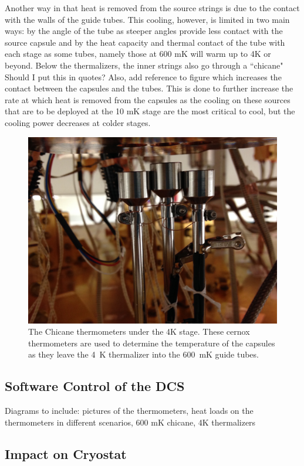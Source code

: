 Another way in that heat is removed from the source strings is due to the contact with the walls of the guide tubes. This cooling, however, is limited in two main ways: by the angle of the tube as steeper angles provide less contact with the source capsule and by the heat capacity and thermal contact of the tube with each stage as some tubes, namely those at 600 mK will warm up to 4K or beyond. Below the thermalizers, the inner strings also go through a ``chicane" \color{red} Should I put this in quotes? Also, add reference to figure\color{black} which increases the contact between the capsules and the tubes. This is done to further increase the rate at which heat is removed from the capsules as the cooling on these sources that are to be deployed at the 10 mK stage are the most critical to cool, but the cooling power decreases at colder stages. 

\begin{figure}[htbp]
    \centering
    \includegraphics[width=0.8\linewidth]{Figures/ChicaneThermometers.JPG}
    \caption[The chicane thermometers.]
    {The Chicane thermometers under the 4K stage.
    These cernox thermometers are used to determine the temperature of the capsules as they leave the 4~K thermalizer into the 600~mK guide tubes.}
    \label{fig:chicane_thermometers}
\end{figure}

\subsection{Software Control of the DCS}
Diagrams to include: pictures of the thermometers, heat loads on the thermometers in different scenarios, 600 mK chicane, 4K thermalizers
\subsection{Impact on Cryostat}

